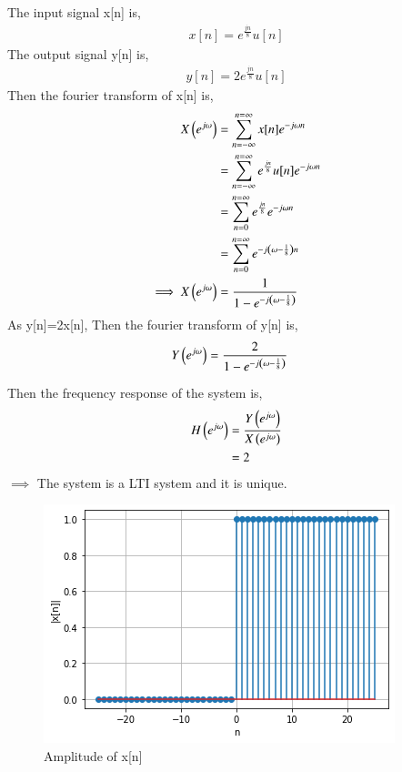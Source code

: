\documentclass[journal,12pt,twocolumn]{IEEEtran}
\begin{document}
The input signal x[n] is,
\begin{align}
    x[n]=e^{\frac{jn}{8}}u[n]\label{0}
\end{align}
The output signal y[n] is,
\begin{align}
    y[n]=2e^{\frac{jn}{8}}u[n]\label{1}
\end{align}
Then the fourier transform of x[n] is,
\begin{align}
    X\left(e^{j\omega}\right)&=\sum\limits_{n=-\infty}^{n=\infty}x[n]e^{-j\omega n}\\
    &=\sum\limits_{n=-\infty}^{n=\infty}e^{\frac{jn}{8}}u[n]e^{-j\omega n}\\
    &=\sum\limits_{n=0}^{n=\infty}e^{\frac{jn}{8}}e^{-j\omega n}\\
    &=\sum\limits_{n=0}^{n=\infty}e^{-j\left(\omega-\frac{1}{8}\right) n}\\
    \implies X\left(e^{j\omega}\right)&=\frac{1}{1-e^{-j\left(\omega-\frac{1}{8}\right)}}
\end{align}
As y[n]=2x[n],
Then the fourier transform of y[n] is,
\begin{align}
    Y\left(e^{j\omega}\right)&=\frac{2}{1-e^{-j\left(\omega-\frac{1}{8}\right)}}
\end{align}

Then the frequency response of the system is,
\begin{align}
    H\left(e^{j\omega}\right)&=\frac{Y\left(e^{j\omega}\right)}{X\left(e^{j\omega}\right)}\\
    &=2
\end{align}
$\implies$ The system is a LTI system and it is unique.

\begin{figure}[!htp]
    \centering
    \includegraphics[width = \columnwidth]{1.PNG}
    \caption{Amplitude of x[n]}
    \label{f1}
\end{figure}
\end{document}
